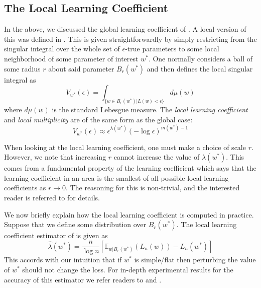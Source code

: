 \documentclass{article} %
\theoremstyle{definition}
\begin{document}
\subsection{The Local Learning Coefficient}
In the above, we discussed the global learning coefficient of \citep{Watanabe2009AlgebraicGA}. A local version of this was defined in \citep{lau2024locallearningcoefficientsingularityaware}. This is given straightforwardly by simply restricting from the singular integral over the whole set of $\epsilon$-true parameters to some local neighborhood of some parameter of interest $w^*$. One normally considers a ball of some radius $r$ about said parameter $B_r(w^*)$ and then defines the local singular integral as
\begin{equation}
    V_{w^*}(\epsilon) = \int_{\{w\in B_r(w^*)|L(w)<\epsilon\}} d \mu(w) 
\end{equation}
where $d \mu(w)$ is the standard Lebesgue measure. The \textit{local learning coefficient} and \textit{local multiplicity} are of the same form as the global case:
\begin{equation}
    V_{w^*}(\epsilon) \approx \epsilon^{\lambda(w^*)}(- \log \epsilon)^{m(w^*)-1}
\end{equation}

When looking at the local learning coefficient, one must make a choice of scale $r$. However, we note that increasing $r$ cannot increase the value of $\lambda(w^*)$. This comes from a fundamental property of the learning coefficient which says that the learning coefficient in an area is the smallest of all possible local learning coefficients as $r \to 0$. The reasoning for this is non-trivial, and the interested reader is referred to \citep{Watanabe2009AlgebraicGA} for details. 

We now briefly explain how the local learning coefficient is computed in practice. Suppose that we define some distribution over $B_r(w^*)$. The local learning coefficient estimator of \citep{lau2024locallearningcoefficientsingularityaware} is given as
\begin{equation}
    \hat{\lambda}(w^*) = \frac{n}{\log n}[\mathbb{E}_{w|B_r(w^*)}(L_n(w)) -L_n(w^*)]
\end{equation}
This accords with our intuition that if $w^*$ is simple/flat then perturbing the value of $w^*$ should not change the loss. For in-depth experimental results for the accuracy of this estimator we refer readers to \citep{lau2024locallearningcoefficientsingularityaware} and \citep{wang2024differentiationspecializationattentionheads}.
\end{document}
